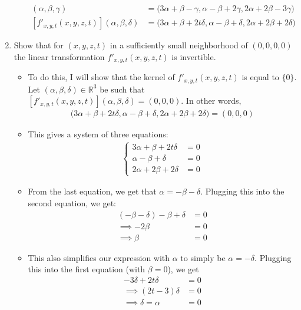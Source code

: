 \documentclass[10pt,a4paper]{article}
\theoremstyle{definition}
\theoremstyle{definition}
\numberwithin{equation}{section}
\begin{document}
\begin{enumerate}[label = (\alph*)]
\begin{itemize}
	\begin{align*}
	[f'_{x, y, z}(x, y, z, t)](\alpha, \beta, \gamma) &= \bigg(3\alpha + \beta - \gamma, \alpha - \beta + 2\gamma, 2\alpha + 2\beta - 3\gamma\bigg)\\
	[f'_{x, y, t}(x, y, z, t)](\alpha, \beta, \delta) &= \bigg(3\alpha + \beta + 2t\delta, \alpha - \beta + \delta, 2\alpha + 2\beta + 2\delta\bigg)
	\end{align*}
	\end{itemize}
\item Show that for $(x, y, z, t)$ in a sufficiently small neighborhood of $(0, 0, 0, 0)$ the linear transformation $f'_{x, y, t}(x, y, z, t)$ is invertible.
	\begin{itemize}
	\item To do this, I will show that the kernel of $f'_{x, y, t}(x, y, z, t)$ is equal to $\{0\}$. Let $(\alpha, \beta, \delta) \in \mathbb{R}^3$ be such that $[f'_{x, y, t}(x, y, z, t)](\alpha, \beta, \delta) = (0,0,0)$. In other words,
	\begin{align*}
	\bigg(3\alpha + \beta + 2t\delta, \alpha - \beta + \delta, 2\alpha + 2\beta + 2\delta\bigg) = (0,0,0)
	\end{align*}	
	\item This gives a system of three equations:
	\begin{align*}
	\begin{cases}
	3\alpha + \beta + 2t\delta &= 0\\
	\alpha - \beta + \delta &= 0\\
	2\alpha + 2\beta + 2\delta &= 0
	\end{cases}
	\end{align*}
	\item From the last equation, we get that $\alpha = -\beta - \delta$. Plugging this into the second equation, we get:
	\begin{align*}
	(-\beta - \delta) - \beta + \delta &= 0\\
	\implies -2\beta &= 0\\
	\implies \beta &= 0
	\end{align*}	
	\item This also simplifies our expression with $\alpha$ to simply be $\alpha = -\delta$. Plugging this into the first equation (with $\beta = 0$), we get
	\begin{align*}
	-3\delta + 2t\delta &= 0\\
	\implies (2t - 3)\delta &= 0\\
	\implies \delta = \alpha &= 0
	\end{align*}		

\end{itemize}
\end{enumerate}
\end{document}
